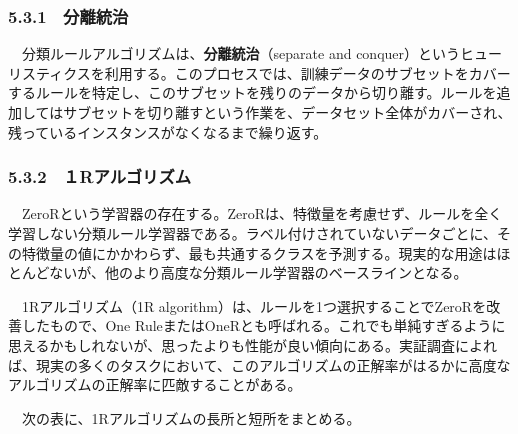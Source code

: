 \documentclass[
]{article}
\begin{document}
\subsubsection{5.3.1　分離統治}\label{ux5206ux96e2ux7d71ux6cbb}

　分類ルールアルゴリズムは、\textbf{分離統治}（separate and
conquer）というヒューリスティクスを利用する。このプロセスでは、訓練データのサブセットをカバーするルールを特定し、このサブセットを残りのデータから切り離す。ルールを追加してはサブセットを切り離すという作業を、データセット全体がカバーされ、残っているインスタンスがなくなるまで繰り返す。

\subsubsection{5.3.2　１Rアルゴリズム}\label{rux30a2ux30ebux30b4ux30eaux30baux30e0}

　ZeroRという学習器の存在する。ZeroRは、特徴量を考慮せず、ルールを全く学習しない分類ルール学習器である。ラベル付けされていないデータごとに、その特徴量の値にかかわらず、最も共通するクラスを予測する。現実的な用途はほとんどないが、他のより高度な分類ルール学習器のベースラインとなる。

　1Rアルゴリズム（1R
algorithm）は、ルールを1つ選択することでZeroRを改善したもので、One
RuleまたはOneRとも呼ばれる。これでも単純すぎるように思えるかもしれないが、思ったよりも性能が良い傾向にある。実証調査によれば、現実の多くのタスクにおいて、このアルゴリズムの正解率がはるかに高度なアルゴリズムの正解率に匹敵することがある。

　次の表に、1Rアルゴリズムの長所と短所をまとめる。
\end{document}
